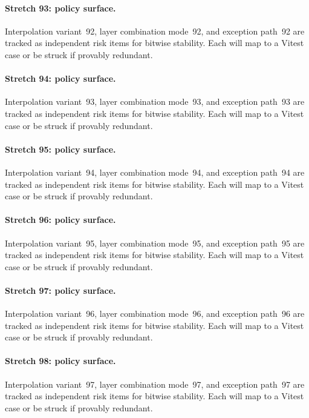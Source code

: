 \documentclass[sigconf,nonacm]{acmart}
\begin{document}
\paragraph{Stretch 93: policy surface.}
Interpolation variant~92, layer combination mode~92, and exception path~92 are tracked as independent risk items for bitwise stability. Each will map to a Vitest case or be struck if provably redundant. %

\paragraph{Stretch 94: policy surface.}
Interpolation variant~93, layer combination mode~93, and exception path~93 are tracked as independent risk items for bitwise stability. Each will map to a Vitest case or be struck if provably redundant. %

\paragraph{Stretch 95: policy surface.}
Interpolation variant~94, layer combination mode~94, and exception path~94 are tracked as independent risk items for bitwise stability. Each will map to a Vitest case or be struck if provably redundant. %

\paragraph{Stretch 96: policy surface.}
Interpolation variant~95, layer combination mode~95, and exception path~95 are tracked as independent risk items for bitwise stability. Each will map to a Vitest case or be struck if provably redundant. %

\paragraph{Stretch 97: policy surface.}
Interpolation variant~96, layer combination mode~96, and exception path~96 are tracked as independent risk items for bitwise stability. Each will map to a Vitest case or be struck if provably redundant. %

\paragraph{Stretch 98: policy surface.}
Interpolation variant~97, layer combination mode~97, and exception path~97 are tracked as independent risk items for bitwise stability. Each will map to a Vitest case or be struck if provably redundant. %
\end{document}
